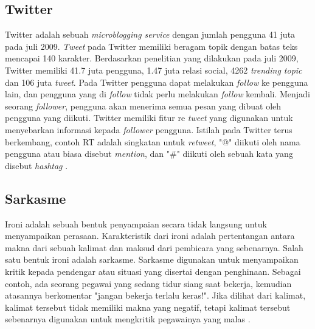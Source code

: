 \subsection{Twitter}
Twitter adalah sebuah \textit{microblogging service }dengan jumlah 
pengguna 41 juta pada juli 2009. \textit{Tweet} pada Twitter memiliki 
beragam topik dengan batas teks mencapai 140 karakter. Berdasarkan 
penelitian yang dilakukan pada juli 2009, Twitter memiliki 41.7 juta 
pengguna, 1.47 juta relasi social, 4262 \textit{trending topic }dan 
106 juta \textit{tweet}. Pada Twitter pengguna dapat melakukan 
\textit{follow} ke pengguna lain, dan pengguna yang di \textit{follow
} tidak perlu melakukan \textit{follow} kembali. Menjadi seorang 
\textit{follower}, pengguna akan menerima semua pesan yang dibuat 
oleh pengguna yang diikuti\textit{. }Twitter memiliki fitur re
\textit{tweet} yang digunakan untuk menyebarkan informasi kepada 
\textit{follower} pengguna. Istilah pada Twitter terus berkembang, 
contoh RT adalah singkatan untuk \textit{retweet}, "@" diikuti oleh 
nama pengguna atau biasa disebut \textit{mention}, dan "\#" diikuti 
oleh sebuah kata yang disebut \textit{hashtag }\cite{19}.
\subsection{Sarkasme}
Ironi adalah sebuah bentuk penyampaian secara tidak langsung untuk 
menyampaikan perasaan. Karakteristik dari ironi adalah pertentangan 
antara makna dari sebuah kalimat dan maksud dari pembicara yang 
sebenarnya. Salah satu bentuk ironi adalah sarkasme. Sarkasme digunakan 
untuk menyampaikan kritik kepada pendengar atau situasi yang disertai 
dengan penghinaan. Sebagai contoh, ada seorang pegawai yang sedang tidur 
siang saat bekerja, kemudian atasannya berkomentar "jangan bekerja 
terlalu keras!". Jika dilihat dari kalimat, kalimat tersebut tidak 
memiliki makna yang negatif, tetapi kalimat tersebut sebenarnya 
digunakan untuk mengkritik pegawainya yang malas \cite{20}.
\newpage